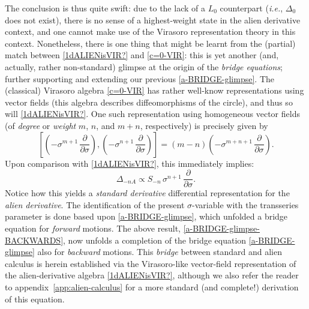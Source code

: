 \documentclass[11pt,a4paper]{article}
\newcommand{\be}{\begin{equation}}
\newcommand{\ee}{\end{equation}}
\begin{document}
The conclusion is thus quite swift: due to the lack of a $L_0$ counterpart (\textit{i.e.}, $\Delta_0$ does not exist), there is no sense of a highest-weight state in the alien derivative context, and one cannot make use of the Virasoro representation theory in this context. Nonetheless, there is one thing that might be learnt from the (partial) match between \eqref{1dALIENisVIR?} and \eqref{c=0-VIR}: this is yet another (and, actually, rather non-standard) glimpse at the origin of the \textit{bridge equations}; further supporting and extending our previous \eqref{a-BRIDGE-glimpse}. The (classical) Virasoro algebra \eqref{c=0-VIR} has rather well-know representations using vector fields (this algebra describes diffeomorphisms of the circle), and thus so will \eqref{1dALIENisVIR?}. One such representation using homogeneous vector fields (of \textit{degree} or \textit{weight} $m$, $n$, and $m+n$, respectively) is precisely given by
%
\be
\left[ \left( -\sigma^{m+1}\, \frac{\partial}{\partial\sigma} \right), \left( -\sigma^{n+1}\, \frac{\partial}{\partial\sigma} \right) \right] = \left( m-n \right) \left( -\sigma^{m+n+1}\, \frac{\partial}{\partial\sigma} \right).
\ee
%
\noindent
Upon comparison with \eqref{1dALIENisVIR?}, this immediately implies:
%
\be
\label{a-BRIDGE-glimpse-BACKWARDS}
\Delta_{-nA} \propto S_{-n}\, \sigma^{n+1}\, \frac{\partial}{\partial\sigma}.
\ee
%
\noindent
Notice how this yields a \textit{standard derivative} differential representation for the \textit{alien derivative}. The identification of the present $\sigma$-variable with the transseries parameter is done based upon \eqref{a-BRIDGE-glimpse}, which unfolded a bridge equation for \textit{forward} motions. The above result, \eqref{a-BRIDGE-glimpse-BACKWARDS}, now unfolds a completion of the bridge equation \eqref{a-BRIDGE-glimpse} also for \textit{backward} motions. This \textit{bridge} between standard and alien calculus is herein established via the Virasoro-like vector-field representation of the alien-derivative algebra \eqref{1dALIENisVIR?}, although we also refer the reader to appendix~\ref{app:alien-calculus} for a more standard (and complete!) derivation of this equation.
\end{document}
